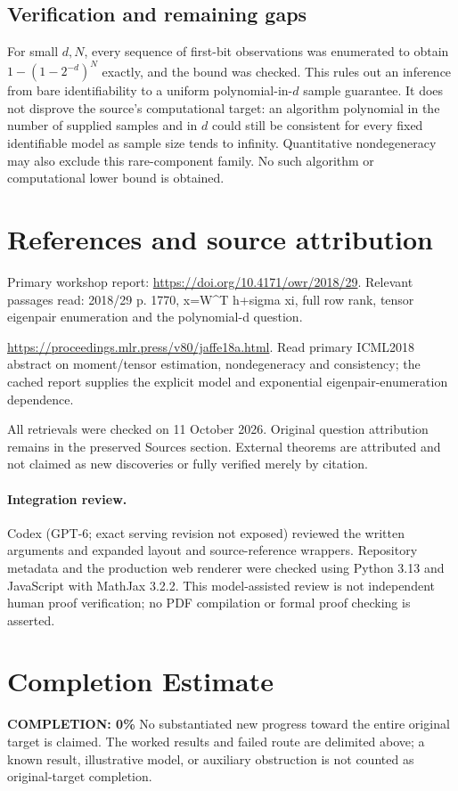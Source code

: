 \documentclass[11pt]{article}
\begin{document}
\subsection{Verification and remaining gaps}
For small $d,N$, every sequence of first-bit observations was enumerated to obtain $1-(1-2^{-d})^N$ exactly, and the bound was checked. This rules out an inference from bare identifiability to a uniform polynomial-in-$d$ sample guarantee. It does not disprove the source's computational target: an algorithm polynomial in the number of supplied samples and in $d$ could still be consistent for every fixed identifiable model as sample size tends to infinity. Quantitative nondegeneracy may also exclude this rare-component family. No such algorithm or computational lower bound is obtained.

\section{References and source attribution}
Primary workshop report: \url{https://doi.org/10.4171/owr/2018/29}. Relevant passages read: 2018/29 p. 1770, x=W^T h+sigma xi, full row rank, tensor eigenpair enumeration and the polynomial-d question.

\url{https://proceedings.mlr.press/v80/jaffe18a.html}. Read primary ICML2018 abstract on moment/tensor estimation, nondegeneracy and consistency; the cached report supplies the explicit model and exponential eigenpair-enumeration dependence.

All retrievals were checked on 11 October 2026. Original question attribution remains in the preserved Sources section. External theorems are attributed and not claimed as new discoveries or fully verified merely by citation.


\paragraph{Integration review.} Codex (GPT-6; exact serving revision not exposed) reviewed the written arguments and expanded layout and source-reference wrappers. Repository metadata and the production web renderer were checked using Python 3.13 and JavaScript with MathJax 3.2.2. This model-assisted review is not independent human proof verification; no PDF compilation or formal proof checking is asserted.

\section{Completion Estimate}
\noindent\textbf{COMPLETION: 0\%}
No substantiated new progress toward the entire original target is claimed. The worked results and failed route are delimited above; a known result, illustrative model, or auxiliary obstruction is not counted as original-target completion.
\end{document}
